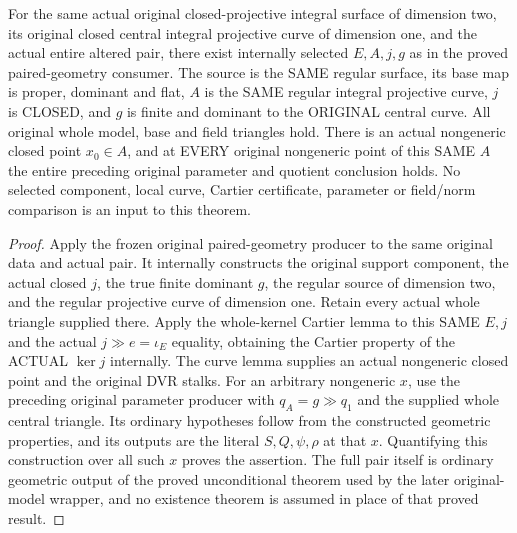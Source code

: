 \begin{theorem}
\label{thm:pl-gauss-paired-surface-actual-parameters}
\leanok
For the same actual original closed-projective integral surface of
dimension two, its original closed central integral projective curve
of dimension one, and the actual entire altered pair, there exist
internally selected $E,A,j,g$ as in the proved paired-geometry
consumer. The source is the SAME regular surface, its base map is
proper, dominant and flat, $A$ is the SAME regular integral
projective curve, $j$ is CLOSED, and $g$ is finite and dominant to
the ORIGINAL central curve. All original whole model, base and
field triangles hold. There is an actual nongeneric closed point
$x_0\in A$, and at EVERY original nongeneric point of this SAME
$A$ the entire preceding original parameter and quotient conclusion
holds. No selected component, local curve, Cartier certificate,
parameter or field/norm comparison is an input to this theorem.
\end{theorem}
\begin{proof}
Apply the frozen original paired-geometry producer to the same
original data and actual pair. It internally constructs the
original support component, the actual closed $j$, the true finite
dominant $g$, the regular source of dimension two, and the regular
projective curve of dimension one. Retain every actual whole
triangle supplied there. Apply the whole-kernel Cartier lemma to
this SAME $E,j$ and the actual $j\gg e=\iota_E$ equality, obtaining
the Cartier property of the ACTUAL $\ker j$ internally. The curve
lemma supplies an actual nongeneric closed point and the original
DVR stalks. For an arbitrary nongeneric $x$, use the preceding
original parameter producer with $q_A=g\gg q_1$ and the supplied
whole central triangle. Its ordinary hypotheses follow from the
constructed geometric properties, and its outputs are the literal
$S,Q,\psi,\rho$ at that $x$. Quantifying this construction over all
such $x$ proves the assertion. The full pair itself is ordinary
geometric output of the proved unconditional theorem used by the
later original-model wrapper, and no existence theorem is assumed
in place of that proved result.
\end{proof}
